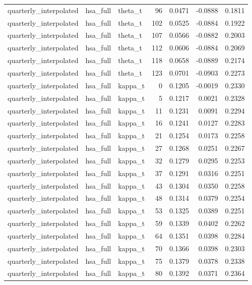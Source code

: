 \begin{tabular}{lllrrrr}
quarterly\_interpolated & hsa\_full & theta\_t & 96 & 0.0471 & -0.0888 & 0.1811 \\
quarterly\_interpolated & hsa\_full & theta\_t & 102 & 0.0525 & -0.0884 & 0.1922 \\
quarterly\_interpolated & hsa\_full & theta\_t & 107 & 0.0566 & -0.0882 & 0.2003 \\
quarterly\_interpolated & hsa\_full & theta\_t & 112 & 0.0606 & -0.0884 & 0.2069 \\
quarterly\_interpolated & hsa\_full & theta\_t & 118 & 0.0658 & -0.0889 & 0.2174 \\
quarterly\_interpolated & hsa\_full & theta\_t & 123 & 0.0701 & -0.0903 & 0.2273 \\
quarterly\_interpolated & hsa\_full & kappa\_t & 0 & 0.1205 & -0.0019 & 0.2330 \\
quarterly\_interpolated & hsa\_full & kappa\_t & 5 & 0.1217 & 0.0021 & 0.2328 \\
quarterly\_interpolated & hsa\_full & kappa\_t & 11 & 0.1231 & 0.0091 & 0.2294 \\
quarterly\_interpolated & hsa\_full & kappa\_t & 16 & 0.1241 & 0.0127 & 0.2283 \\
quarterly\_interpolated & hsa\_full & kappa\_t & 21 & 0.1254 & 0.0173 & 0.2258 \\
quarterly\_interpolated & hsa\_full & kappa\_t & 27 & 0.1268 & 0.0251 & 0.2267 \\
quarterly\_interpolated & hsa\_full & kappa\_t & 32 & 0.1279 & 0.0295 & 0.2253 \\
quarterly\_interpolated & hsa\_full & kappa\_t & 37 & 0.1291 & 0.0316 & 0.2251 \\
quarterly\_interpolated & hsa\_full & kappa\_t & 43 & 0.1304 & 0.0350 & 0.2258 \\
quarterly\_interpolated & hsa\_full & kappa\_t & 48 & 0.1314 & 0.0379 & 0.2254 \\
quarterly\_interpolated & hsa\_full & kappa\_t & 53 & 0.1325 & 0.0389 & 0.2251 \\
quarterly\_interpolated & hsa\_full & kappa\_t & 59 & 0.1339 & 0.0402 & 0.2262 \\
quarterly\_interpolated & hsa\_full & kappa\_t & 64 & 0.1351 & 0.0398 & 0.2284 \\
quarterly\_interpolated & hsa\_full & kappa\_t & 70 & 0.1366 & 0.0398 & 0.2303 \\
quarterly\_interpolated & hsa\_full & kappa\_t & 75 & 0.1379 & 0.0378 & 0.2338 \\
quarterly\_interpolated & hsa\_full & kappa\_t & 80 & 0.1392 & 0.0371 & 0.2364 \\

\end{tabular}

